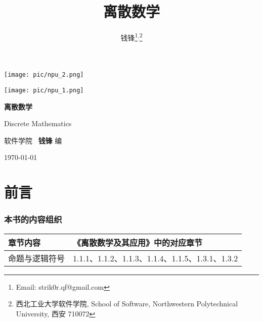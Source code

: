 \documentclass[10pt,UTF8]{book} %
\title{\textbf{离散数学}}
\author{钱锋\thanks{Email: strik0r.qf@gmail.com}${}^,$\thanks{
    西北工业大学软件学院, School of Software, Northwestern Polytechnical University, 西安 710072
}}
\begin{document}
\everymath{\displaystyle}


\pagestyle{empty}
\begin{titlepage}
    \thispagestyle{empty}
    \centering
        \vspace*{2cm}
        \texttt{[image: pic/npu\_2.png]}\par
        \vspace{1em}
        \texttt{[image: pic/npu\_1.png]}\par
    \vspace{1em}
        \begin{center}
            \Huge \heiti \textbf{离散数学}

            Discrete Mathematics
        \end{center}
        \vspace{17em}
        \begin{center}
        \songti
        \kaishu 软件学院 \, \heiti\textbf{钱锋} \quad \songti 编
        \vspace{0.5em}

    \today
    \end{center}
\end{titlepage}
\cleardoublepage
\maketitle
\cleardoublepage

\frontmatter
\newpage
\pagestyle{plain}
\makeatother


\chapter{前言}
\thispagestyle{empty}

\subsection*{本书的内容组织}

{
\begin{longtable}{p{}|p{}}
    \toprule
    \textbf{章节内容} & \textbf{《离散数学及其应用》中的对应章节} \\
    \midrule
    \endhead
    \bottomrule
    \endfoot

    命题与逻辑符号 & 1.1.1、1.1.2、1.1.3、1.1.4、1.1.5、1.3.1、1.3.2 \\
\end{longtable}}
\end{document}
